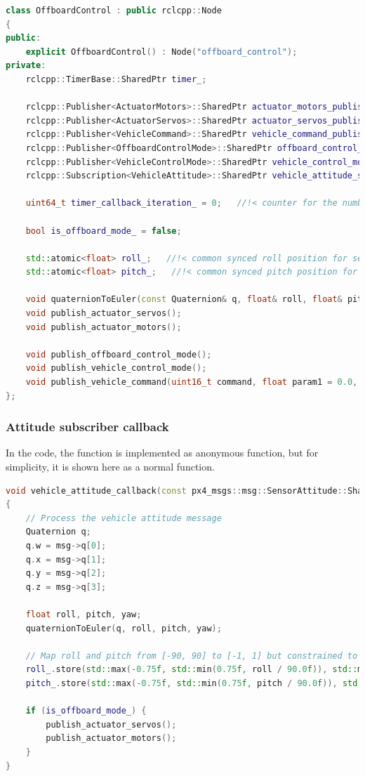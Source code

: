 \documentclass[a4paper]{article}
\begin{document}
\begin{lstlisting}[language=C++, caption=Offboard control example]
class OffboardControl : public rclcpp::Node 
{
public:
    explicit OffboardControl() : Node("offboard_control");
private:
    rclcpp::TimerBase::SharedPtr timer_;

    rclcpp::Publisher<ActuatorMotors>::SharedPtr actuator_motors_publisher_;
    rclcpp::Publisher<ActuatorServos>::SharedPtr actuator_servos_publisher_;
    rclcpp::Publisher<VehicleCommand>::SharedPtr vehicle_command_publisher_;
    rclcpp::Publisher<OffboardControlMode>::SharedPtr offboard_control_mode_publisher_;
    rclcpp::Publisher<VehicleControlMode>::SharedPtr vehicle_control_mode_publisher_;
    rclcpp::Subscription<VehicleAttitude>::SharedPtr vehicle_attitude_subscription_;

    uint64_t timer_callback_iteration_ = 0;   //!< counter for the number of setpoints sent

    bool is_offboard_mode_ = false;

    std::atomic<float> roll_;   //!< common synced roll position for servos
    std::atomic<float> pitch_;   //!< common synced pitch position for servos

    void quaternionToEuler(const Quaternion& q, float& roll, float& pitch, float& yaw);
    void publish_actuator_servos();
    void publish_actuator_motors();

    void publish_offboard_control_mode();
    void publish_vehicle_control_mode();
    void publish_vehicle_command(uint16_t command, float param1 = 0.0, float param2 = 0.0);
};
\end{lstlisting}

\subsubsection{Attitude subscriber callback}

In the code, the function is implemented as anonymous function, but for simplicity, it is shown here as a normal function.

\begin{lstlisting}[language=C++, caption=Attitude subscriber callback]
void vehicle_attitude_callback(const px4_msgs::msg::SensorAttitude::SharedPtr msg)
{
    // Process the vehicle attitude message
    Quaternion q;
    q.w = msg->q[0];
    q.x = msg->q[1];
    q.y = msg->q[2];
    q.z = msg->q[3];

    float roll, pitch, yaw;
    quaternionToEuler(q, roll, pitch, yaw);

    // Map roll and pitch from [-90, 90] to [-1, 1] but constrained to [-0.75, 0.75]
    roll_.store(std::max(-0.75f, std::min(0.75f, roll / 90.0f)), std::memory_order_relaxed);
    pitch_.store(std::max(-0.75f, std::min(0.75f, pitch / 90.0f)), std::memory_order_relaxed);

    if (is_offboard_mode_) {
        publish_actuator_servos();
        publish_actuator_motors();
    }
}
\end{lstlisting}
\end{document}
